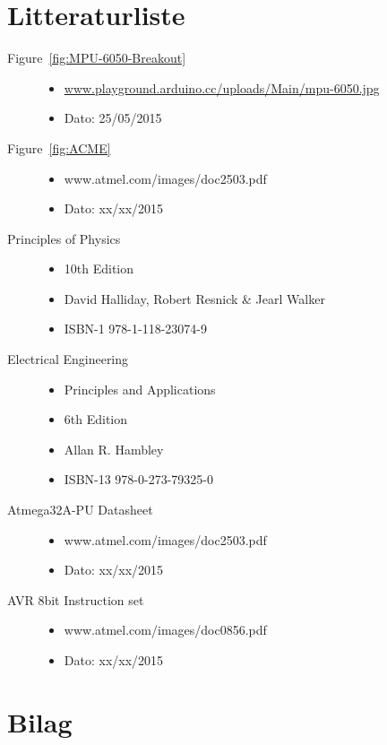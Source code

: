 \section{Litteraturliste}

\begin{description}
	\item[Figure~\ref{fig:MPU-6050-Breakout}] \hfill
		\begin{itemize}
			\item \url{www.playground.arduino.cc/uploads/Main/mpu-6050.jpg}
			\item Dato: 25/05/2015
		\end{itemize}

	\item[Figure~\ref{fig:ACME}] \hfill
		\begin{itemize}
			\item www.atmel.com/images/doc2503.pdf
			\item Dato: xx/xx/2015
		\end{itemize}
		
		\item[Principles of Physics] \hfill
		\begin{itemize}
			\item 10th Edition
			\item David Halliday, Robert Resnick \& Jearl Walker
			\item ISBN-1 978-1-118-23074-9
		\end{itemize}
	\item[Electrical Engineering] \hfill
		\begin{itemize}
			\item Principles and Applications
			\item 6th Edition
			\item Allan R. Hambley
			\item ISBN-13 978-0-273-79325-0
		\end{itemize}
	\item[Atmega32A-PU Datasheet] \hfill
		\begin{itemize}
			\item www.atmel.com/images/doc2503.pdf
			\item Dato: xx/xx/2015
		\end{itemize}
	\item[AVR 8bit Instruction set] \hfill
		\begin{itemize}
			\item www.atmel.com/images/doc0856.pdf
			\item Dato: xx/xx/2015
		\end{itemize}
\end{description}

\section{Bilag}

